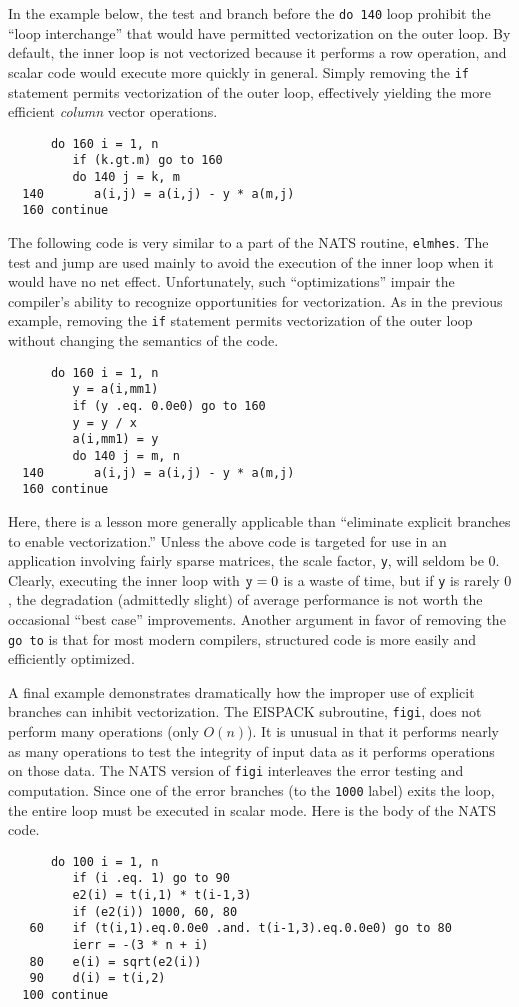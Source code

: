 \begin{enumerate}
In the example below, the test and branch before the {\tt do 140} loop
prohibit the ``loop interchange'' that would have permitted vectorization
on the outer loop.  By default, the inner loop is not vectorized because
it performs a row operation, and scalar code would execute more quickly in
general.
Simply removing the {\tt if} statement permits vectorization of the outer loop,
effectively yielding the more efficient {\em column} vector operations.

\begin{verbatim}
      do 160 i = 1, n
         if (k.gt.m) go to 160
         do 140 j = k, m
  140       a(i,j) = a(i,j) - y * a(m,j)
  160 continue
\end{verbatim}

The following code is very similar to a part of the NATS routine, {\tt elmhes}.
The test and jump are used mainly to avoid the execution of the inner loop
when it would have no net effect.  Unfortunately, such ``optimizations''
impair the compiler's ability to recognize opportunities for vectorization.
As in the previous example, removing the {\tt if} statement permits
vectorization of the outer loop without changing the semantics of the code.

\begin{verbatim}
      do 160 i = 1, n
         y = a(i,mm1)
         if (y .eq. 0.0e0) go to 160
         y = y / x
         a(i,mm1) = y
         do 140 j = m, n
  140       a(i,j) = a(i,j) - y * a(m,j)
  160 continue
\end{verbatim}

 Here, there is a lesson more generally applicable than ``eliminate explicit
 branches to enable vectorization.''
 Unless the above code is targeted for use in an application involving
 fairly sparse matrices, the scale factor, {\tt y}, will seldom be $0$.
 Clearly, executing the inner loop with ${\tt y} = 0$ is a waste of time,
 but if {\tt y} is rarely $0$, the degradation (admittedly slight) of average
 performance is not worth the occasional ``best case'' improvements.
 Another argument in favor of removing the {\tt go to} is that for most
 modern compilers, structured code is more easily and efficiently optimized. 

 A final example demonstrates dramatically how the improper
 use of explicit branches can inhibit vectorization.
 The EISPACK subroutine, {\tt figi}, does not perform many operations
 (only $O(n)$).  It is unusual in that it performs nearly as many
 operations to test the integrity of input data as it performs operations
 on those data.  The NATS version of {\tt figi} interleaves the error testing
 and computation.  Since one of the error branches (to the {\tt 1000} label)
 exits the loop, the entire loop must be executed in scalar mode.
 Here is the body of the NATS code.
\begin{verbatim}
      do 100 i = 1, n
         if (i .eq. 1) go to 90
         e2(i) = t(i,1) * t(i-1,3)
         if (e2(i)) 1000, 60, 80
   60    if (t(i,1).eq.0.0e0 .and. t(i-1,3).eq.0.0e0) go to 80
         ierr = -(3 * n + i)
   80    e(i) = sqrt(e2(i))
   90    d(i) = t(i,2)
  100 continue
\end{verbatim}


\end{enumerate}
